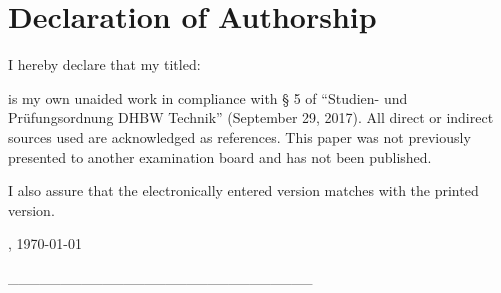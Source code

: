 \section*{Declaration of Authorship}
I hereby declare that my \arbeit{} titled:
\begin{quote}
	\textit{\titel}
\end{quote} 
is my own unaided work in compliance with § 5 of \enquote{Studien- und Prüfungsordnung DHBW Technik} (September 29, 2017). All direct or indirect sources used are acknowledged as references.
This paper was not previously presented to another examination board and has not been
published.

\vspace{0.25cm}

I also assure that the electronically entered version matches with the printed version.

\vspace{1cm}

\verfassungsort, \today \\[0.5cm]
	
	{_____________________________}
	{\makebox[6cm]{\hrulefill}}\\ 
\autorReverse

\vspace*{\fill}
